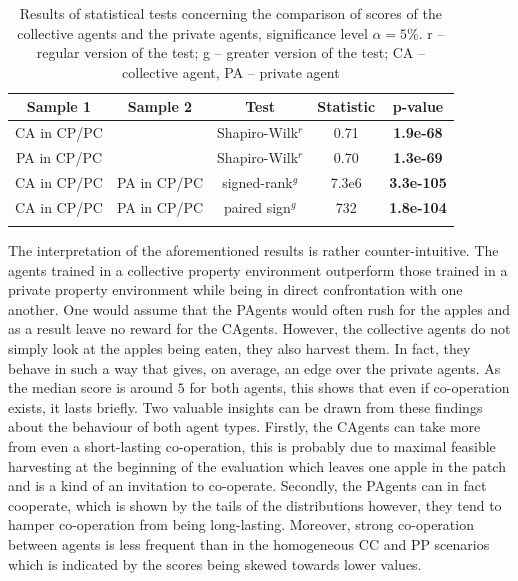 \documentclass[pdflatex,sn-basic,lineno]{sn-jnl}
\theoremstyle{thmstyleone}%
\theoremstyle{thmstyletwo}%
\theoremstyle{thmstylethree}%
\begin{document}
\begin{table}[h!]
\caption{Results of statistical tests concerning the comparison of scores of the collective agents and the private
agents, significance level $\alpha=5\%$. r -- regular version of the test; g -- greater version of the test; CA --
collective agent, PA -- private agent}\label{table:score-hetero}%
\begin{tabular*}{\textwidth}{@{\extracolsep\fill}ccccc}
\toprule
Sample 1             & Sample 2             & Test                        & Statistic & p-value   \\ \midrule
CA in CP/PC &                      & Shapiro-Wilk$^{r}$            & 0.71      & \textbf{1.9e-68}    \\
PA in CP/PC &                      & Shapiro-Wilk$^{r}$            & 0.70      & \textbf{1.3e-69}    \\
CA in CP/PC & PA in CP/PC & signed-rank$^{g}$    & 7.3e6     &  \textbf{3.3e-105}  \\
CA in CP/PC & PA in CP/PC & paired sign$^{g}$  & 732     &  \textbf{1.8e-104}  \\ \botrule
\end{tabular*}

\end{table}


The interpretation of the aforementioned results is rather counter-intuitive. The agents trained in a collective
property environment outperform those trained in a private property environment while being in direct confrontation with
one another. One would assume that the PAgents would often rush for the apples and as a result leave no reward for the
CAgents. However, the collective agents do not simply look at the apples being eaten, they also harvest them. In fact,
they behave in such a way that gives, on average, an edge over the private agents. As the median score is around $5$ for
both agents, this shows that even if co-operation exists, it lasts briefly. Two valuable insights can be drawn from
these findings about the behaviour of both agent types. Firstly, the CAgents can take more from even a short-lasting
co-operation, this is probably due to maximal feasible harvesting at the beginning of the evaluation which leaves one
apple in the patch and is a kind of an invitation to co-operate. Secondly, the PAgents can in fact cooperate, which is
shown by the tails of the distributions however, they tend to hamper co-operation from being long-lasting. Moreover,
strong co-operation between agents is less frequent than in the homogeneous CC and PP scenarios which is indicated by
the scores being skewed towards lower values.
\end{document}
